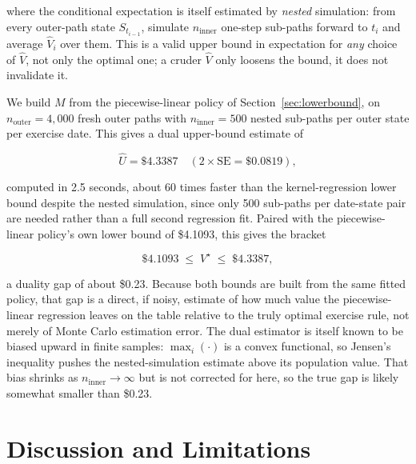 \documentclass[11pt]{article}
\begin{document}
where the conditional expectation is itself estimated by \emph{nested} simulation: from every outer-path state $S_{t_{i-1}}$, simulate $n_{\text{inner}}$ one-step sub-paths forward to $t_i$ and average $\widehat V_i$ over them. This is a valid upper bound in expectation for \emph{any} choice of $\widehat V$, not only the optimal one; a cruder $\widehat V$ only loosens the bound, it does not invalidate it.

We build $M$ from the piecewise-linear policy of Section~\ref{sec:lowerbound}, on $n_{\text{outer}}=4{,}000$ fresh outer paths with $n_{\text{inner}}=500$ nested sub-paths per outer state per exercise date. This gives a dual upper-bound estimate of

\begin{equation}
\widehat U = \$4.3387 \quad (2\times\text{SE} = \$0.0819),
\end{equation}

computed in 2.5 seconds, about 60 times faster than the kernel-regression lower bound despite the nested simulation, since only 500 sub-paths per date-state pair are needed rather than a full second regression fit. Paired with the piecewise-linear policy's own lower bound of \$4.1093, this gives the bracket

\begin{equation}
\$4.1093 \;\le\; V^\star \;\le\; \$4.3387,
\end{equation}

a duality gap of about \$0.23. Because both bounds are built from the same fitted policy, that gap is a direct, if noisy, estimate of how much value the piecewise-linear regression leaves on the table relative to the truly optimal exercise rule, not merely of Monte Carlo estimation error. The dual estimator is itself known to be biased upward in finite samples: $\max_i(\cdot)$ is a convex functional, so Jensen's inequality pushes the nested-simulation estimate above its population value. That bias shrinks as $n_{\text{inner}} \to \infty$ but is not corrected for here, so the true gap is likely somewhat smaller than \$0.23.

\section{Discussion and Limitations}
\end{document}
